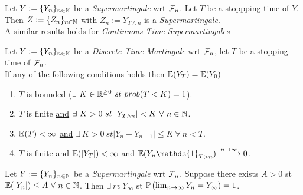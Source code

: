 \documentclass[11pt,a4paper]{article}
\begin{document}

Let $Y:=\{Y_n\}_{n\in\mathbb{N}}$ be a \textit{Supermartingale} wrt $\mathcal{F}_n$. Let $T$ be a stoppping time of $Y$. Then $Z:=\{Z_n\}_{n\in\mathbb{N}}$ with $Z_n:=Y_{T\wedge n}$ is a \textit{Supermartingale}.\\
\nb A similar results holds for \textit{Continuous-Time Supermartingales}

Let $Y:=\{Y_n\}_{n\in\mathbb{N}}$ be a \textit{Discrete-Time Martingale} wrt $\mathcal{F}_n$, let $T$ be a stopping time of $\mathcal{F}_n$.\\
If any of the following conditions holds then $\mathbb{E}(Y_T)=\mathbb{E}(Y_0)$
\begin{enumerate}
	\item $T$ is bounded (\ie $\exists\ K\in\reals^{\geq0}\ st\ prob(T<K)=1$).
	\item $T$ is finite \underline{and} $\exists\ K>0\ st\ |Y_{T\wedge n}|<K\ \forall\ n\in\nats$.
	\item $\mathbb{E}(T)<\infty$ \underline{and} $\exists\ K>0\ st |Y_n-Y_{n-1}|\leq K\ \forall\ n<T$.
	\item $T$ is finite \underline{and} $\mathbb{E}(|Y_T|)<\infty$ \underline{and} $\expect(Y_n\mathds{1}_{T>n})\xrightarrow{n\to\infty}0$.
\end{enumerate}

Let $Y:=\{Y_n\}_{n\in\mathbb{N}}$ be a \textit{Supermartingale} wrt $\mathcal{F}_n$. Suppose there exists $A>0$ st $\expect(|Y_n|)\leq A\ \forall\ n\in\nats$. Then $\exists\ rv\ Y_\infty$ st $\mathbb{P}\left(\lim_{n\to\infty}Y_n=Y_\infty\right)=1$.\\
\end{document}
